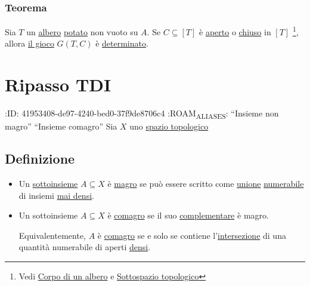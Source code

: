 \documentclass{article}
\newcommand{\1}{\mathds{1}}
\begin{document}
\subsubsection{Teorema}
\label{sec:orgc60abbb}
Sia \(T\) un \href{../../../../../../../org/roam/20250514142154-albero_teoria_descrittiva_degli_insiemi.org}{albero} \href{../../../../../../../org/roam/20250514142208-albero_potato.org}{potato} non vuoto su \(A\). Se \(C \subseteq [T]\) è \href{../../../../../../../org/roam/20250103145124-topologia.org}{aperto} o \href{../../../../../../../org/roam/20250103145124-topologia.org}{chiuso} in \([T]\) \footnote{Vedi \href{../../../../../../../org/roam/20250514142251-corpo_di_un_albero.org}{Corpo di un albero} e \href{../../../../../../../org/roam/20250103163814-sottospazio_topologico.org}{Sottospazio topologico}}, allora \hyperref[sec:org32c74c6]{il gioco} \(G(T,C)\) è \hyperref[sec:org7f68e17]{determinato}.
\section{Ripasso TDI}
\label{sec:orgffd436a}

:ID:       41953408-de97-4240-bed0-37f9de8706c4
:ROAM\textsubscript{ALIASES}: ``Insieme non magro'' ``Insieme comagro''
Sia \(X\) uno \href{../../../../../../../org/roam/20250103145124-topologia.org}{spazio topologico}
\subsection{Definizione}
\label{sec:org6117d9d}

\begin{itemize}
\item Un \href{../../../../../../../org/roam/20250131155822-operazioni_insiemistiche_tra_classi_mk.org}{sottoinsieme} \(A \subseteq X\) è \uline{magro} se può essere scritto come \href{../../../../../../../org/roam/20250131183016-classe_unione.org}{unione} \href{../../../../../../../org/roam/20250111143651-insieme_numerabile.org}{numerabile} di insiemi \href{../../../../../../../org/roam/20250417180515-insieme_mai_denso.org}{mai densi}.
\item Un sottoinsieme \(A \subseteq X\) è \uline{comagro} se il suo \href{../../../../../../../org/roam/20250317100425-complementare_di_un_insieme.org}{complementare} è magro.

Equivalentemente, \(A\) è \uline{comagro} se e solo se contiene l'\href{../../../../../../../org/roam/20250131183141-classe_intersezione.org}{intersezione} di una quantità numerabile di aperti \href{../../../../../../../org/roam/20250301193045-sottoinsieme_denso.org}{densi}.
\end{itemize}
\end{document}

